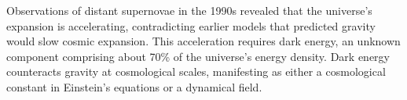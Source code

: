 Observations of distant supernovae in the 1990s revealed that the universe's expansion is accelerating, contradicting earlier models that predicted gravity would slow cosmic expansion. This acceleration requires dark energy, an unknown component comprising about 70\% of the universe's energy density. Dark energy counteracts gravity at cosmological scales, manifesting as either a cosmological constant in Einstein's equations or a dynamical field.
